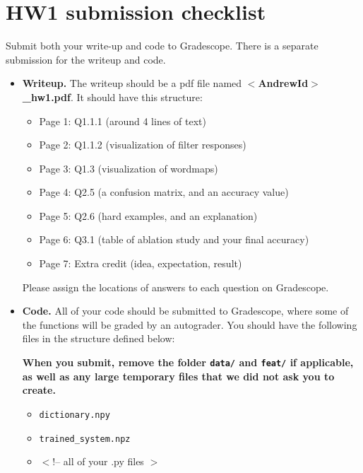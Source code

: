 \documentclass[10pt]{article}
\begin{document}
\section{HW1 submission checklist}
\label{sec:SubChecklist}
Submit both your write-up and code to Gradescope. There is a separate submission for the writeup and code.
\begin{itemize}
\item {\bf Writeup.}
  The writeup should be a pdf file named {\bf $<$AndrewId$>$\_hw1.pdf}. It should have this structure:
  \begin{itemize}
  \item Page 1: Q1.1.1 (around 4 lines of text)
  \item Page 2: Q1.1.2 (visualization of filter responses)
  \item Page 3: Q1.3 (visualization of wordmaps)
  \item Page 4: Q2.5 (a confusion matrix, and an accuracy value)
  \item Page 5: Q2.6 (hard examples, and an explanation)
  \item Page 6: Q3.1 (table of ablation study and your final accuracy)
  \item Page 7: Extra credit (idea, expectation, result)
  \end{itemize}
  
Please assign the locations of answers to each question on Gradescope.
\item {\bf Code.} 
All of your code should be submitted to Gradescope, where some of the functions will be graded by an autograder. You should have the following files in the structure defined below:

{\bf When you submit, remove the folder {\tt data/} and {\tt feat/} if applicable, as well as any large temporary files that we did not ask you to create.}



	\begin{itemize}
		\item {\tt dictionary.npy }
		\item {\tt trained\_system.npz }
		\item $<$!-- all of your .py files $>$
	\end{itemize}


\end{itemize}




\end{document}
